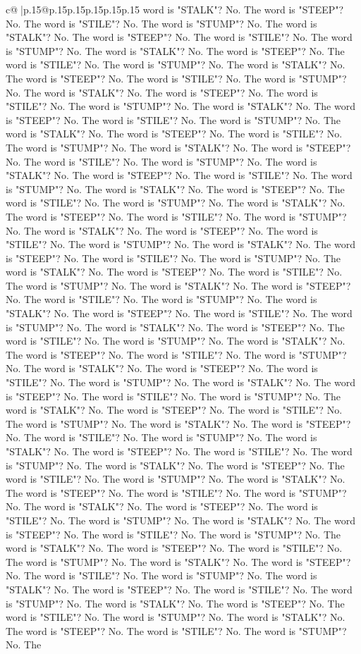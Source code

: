 \documentclass{article}
\begin{document}
{\begin{supertabular}{c@{$\;$}|p{.15\linewidth}@{}p{.15\linewidth}p{.15\linewidth}p{.15\linewidth}p{.15\linewidth}p{.15\linewidth}}
{{{word is "STALK"? No. The word is "STEEP"? No. The word is "STILE"? No. The word is "STUMP"? No. The word is "STALK"? No. The word is "STEEP"? No. The word is "STILE"? No. The word is "STUMP"? No. The word is "STALK"? No. The word is "STEEP"? No. The word is "STILE"? No. The word is "STUMP"? No. The word is "STALK"? No. The word is "STEEP"? No. The word is "STILE"? No. The word is "STUMP"? No. The word is "STALK"? No. The word is "STEEP"? No. The word is "STILE"? No. The word is "STUMP"? No. The word is "STALK"? No. The word is "STEEP"? No. The word is "STILE"? No. The word is "STUMP"? No. The word is "STALK"? No. The word is "STEEP"? No. The word is "STILE"? No. The word is "STUMP"? No. The word is "STALK"? No. The word is "STEEP"? No. The word is "STILE"? No. The word is "STUMP"? No. The word is "STALK"? No. The word is "STEEP"? No. The word is "STILE"? No. The word is "STUMP"? No. The word is "STALK"? No. The word is "STEEP"? No. The word is "STILE"? No. The word is "STUMP"? No. The word is "STALK"? No. The word is "STEEP"? No. The word is "STILE"? No. The word is "STUMP"? No. The word is "STALK"? No. The word is "STEEP"? No. The word is "STILE"? No. The word is "STUMP"? No. The word is "STALK"? No. The word is "STEEP"? No. The word is "STILE"? No. The word is "STUMP"? No. The word is "STALK"? No. The word is "STEEP"? No. The word is "STILE"? No. The word is "STUMP"? No. The word is "STALK"? No. The word is "STEEP"? No. The word is "STILE"? No. The word is "STUMP"? No. The word is "STALK"? No. The word is "STEEP"? No. The word is "STILE"? No. The word is "STUMP"? No. The word is "STALK"? No. The word is "STEEP"? No. The word is "STILE"? No. The word is "STUMP"? No. The word is "STALK"? No. The word is "STEEP"? No. The word is "STILE"? No. The word is "STUMP"? No. The word is "STALK"? No. The word is "STEEP"? No. The word is "STILE"? No. The word is "STUMP"? No. The word is "STALK"? No. The word is "STEEP"? No. The word is "STILE"? No. The word is "STUMP"? No. The word is "STALK"? No. The word is "STEEP"? No. The word is "STILE"? No. The word is "STUMP"? No. The word is "STALK"? No. The word is "STEEP"? No. The word is "STILE"? No. The word is "STUMP"? No. The word is "STALK"? No. The word is "STEEP"? No. The word is "STILE"? No. The word is "STUMP"? No. The word is "STALK"? No. The word is "STEEP"? No. The word is "STILE"? No. The word is "STUMP"? No. The word is "STALK"? No. The word is "STEEP"? No. The word is "STILE"? No. The word is "STUMP"? No. The word is "STALK"? No. The word is "STEEP"? No. The word is "STILE"? No. The word is "STUMP"? No. The word is "STALK"? No. The word is "STEEP"? No. The word is "STILE"? No. The word is "STUMP"? No. The word is "STALK"? No. The word is "STEEP"? No. The word is "STILE"? No. The word is "STUMP"? No. The word is "STALK"? No. The word is "STEEP"? No. The word is "STILE"? No. The word is "STUMP"? No. The word is "STALK"? No. The word is "STEEP"? No. The word is "STILE"? No. The word is "STUMP"? No. The word is "STALK"? No. The word is "STEEP"? No. The word is "STILE"? No. The word is "STUMP"? No. The word is "STALK"? No. The word is "STEEP"? No. The word is "STILE"? No. The word is "STUMP"? No. The }}}
\end{supertabular}}
\end{document}
